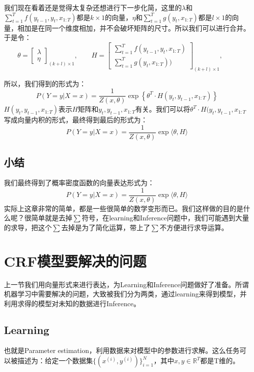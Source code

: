 \documentclass[a4paper]{article}
\begin{document}
我们现在看着还是觉得太复杂还想进行下一步化简，这里的$\lambda$和$\sum_{t=1}^T f(y_{t-1},y_t,x_{1:T})$都是$k \times 1$的向量，$\eta$和$\sum_{t=1}^T g(y_t,x_{1:T})$都是$l \times 1$的向量，相加是在同一个维度相加，并不会破坏矩阵的尺寸。所以我们可以进行合并。于是令：
\begin{equation}
    \theta = \begin{bmatrix} \lambda\\ \eta \end{bmatrix}_{(k+l)\times 1}, \qquad
    H = \begin{bmatrix} \sum_{t=1}^T f(y_{t-1},y_t,x_{1:T})\\ \sum_{t=1}^T g(y_t,x_{1:T})) \end{bmatrix}_{(k+l)\times 1}, \qquad
\end{equation}

所以，我们得到的形式为：
\begin{equation}
     P(Y=y|X=x) = \frac{1}{Z(x,\theta)} \exp \left\{ \theta^T \cdot H(y_t,y_{t-1},x_{1:T}) \right\} 
\end{equation}
$H(y_t,y_{t-1},x_{1:T})$表示$H$矩阵和$y_t,y_{t-1},x_{1:T}$有关。我们可以将$\theta^T \cdot H(y_t,y_{t-1},x_{1:T}$写成向量内积的形式，最终得到最后的形式为：
\begin{equation}
    P(Y=y|X=x) = \frac{1}{Z(x,\theta)} \exp \langle \theta,H \rangle
\end{equation}

\subsection{小结}
我们最终得到了概率密度函数的向量表达形式为：
$$
    P(Y=y|X=x) = \frac{1}{Z(x,\theta)} \exp \langle \theta,H \rangle
$$
实际上这章非常的简单，都是一些很简单的数学变形而已。我们这样做的目的是什么呢？很简单就是去掉$\sum$符号，在learning和Inference问题中，我们可能遇到大量的求导，把这个$\sum$去掉是为了简化运算，带上了$\sum$不方便进行求导运算。

\section{CRF模型要解决的问题}
上一节我们用向量形式来进行表达，为Learning和Inference问题做好了准备。所谓机器学习中需要解决的问题，大致被我们分为两类，通过learning来得到模型，并利用求得的模型对未知的数据进行Inference。
\subsection{Learning}
也就是Parameter estimation，利用数据来对模型中的参数进行求解。这么任务可以被描述为：给定一个数据集$\{ (x^{(i)},y^{(i)}) \}_{i=1}^N$，其中$x,y\in \mathbb{R}^T$都是T维的。
\end{document}
